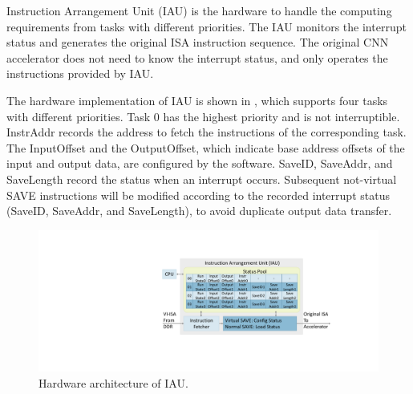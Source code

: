 Instruction Arrangement Unit (IAU) is the hardware to handle the computing requirements from tasks with different priorities. The IAU monitors the interrupt status and generates the original ISA instruction sequence. The original CNN accelerator does not need to know the interrupt status, and only operates the instructions provided by IAU.

The hardware implementation of IAU is shown in , which supports four tasks with different priorities. Task 0 has the highest priority and is not interruptible. 
InstrAddr records the address to fetch the instructions of the corresponding task. The InputOffset and the OutputOffset, which indicate base address offsets of the input and output data, are configured by the software. 
SaveID, SaveAddr, and SaveLength record the status when an interrupt occurs. 
Subsequent not-virtual SAVE instructions will be modified according to the recorded interrupt status (SaveID, SaveAddr, and SaveLength), to avoid duplicate output data transfer.



\begin{figure}[t]
	\centering
	\includegraphics[width=0.9\linewidth]{fig/iau.pdf}
	\caption{Hardware architecture of IAU. 
	}
	\label{fig:IAU}
\end{figure}

